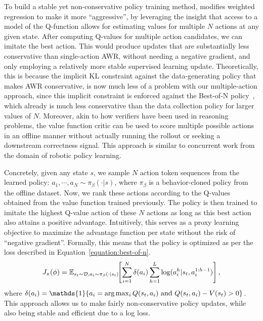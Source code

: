 To build a stable yet non-conservative policy training method, \ourmethod{} modifies weighted regression to make it more ``aggressive'', by leveraging the insight that access to a model of the Q-function allows for estimating values for multiple $N$ actions at any given state. After computing Q-values for multiple action candidates, we can imitate the best action. This would produce updates that are substantially less conservative than single-action AWR, without needing a negative gradient, and only employing a relatively more stable supervised learning update. Theoretically, this is because the implicit KL constraint against the data-generating policy that makes AWR conservative, is now much less of a problem with our multiple-action approach, since this implicit constraint is enforced against the Best-of-N policy~\citep{cobbe2021training}, which already is much less conservative than the data collection policy for larger values of $N$. Moreover, akin to how verifiers have been used in reasoning problems, the value function critic can be used to score multiple possible actions in an offline manner without actually running the rollout or seeking a downstream correctness signal. This approach is similar to concurrent work \citet{sobolmark2024policy} from the domain of robotic policy learning.

Concretely, given any state $s$, we sample $N$ action token sequences from the learned policy: $a_1, \cdots, a_N \sim \pi_\beta(\cdot|s)$, where $\pi_\beta$ is a behavior-cloned policy from the offline dataset. Now, we rank these actions according to the Q-values obtained from the value function trained previously. The policy is then trained to imitate the highest Q-value action of these $N$ actions as long as this best action also attains a positive advantage. Intuitively, this serves as a proxy learning objective to maximize the advantage function per state without the risk of ``negative gradient''. Formally, this means that the policy is optimized as per the loss described in Equation~\ref{equation:best-of-n}. 
\begin{align}
   \label{equation:best-of-n}
    J_\pi(\phi) = \mathbb{E}_{\substack{s_t \sim \mathcal{D}, a_i \sim \pi_\beta(\cdot|s_t)}}\!\! \left[\sum_{i=1}^N \delta(a_i) \sum_{h=1}^L \log(a_i^h|s_t, a_i^{1:h-1})\right], 
\end{align}
where $\delta(a_i) = \mathds{1}\{a_i = \argmax_i Q(s_t, a_i) \text{~and~} Q(s_t, a_i) - V(s_t) > 0\}$. This approach allows us to make fairly non-conservative policy updates, while also being stable and efficient due to a log loss.

